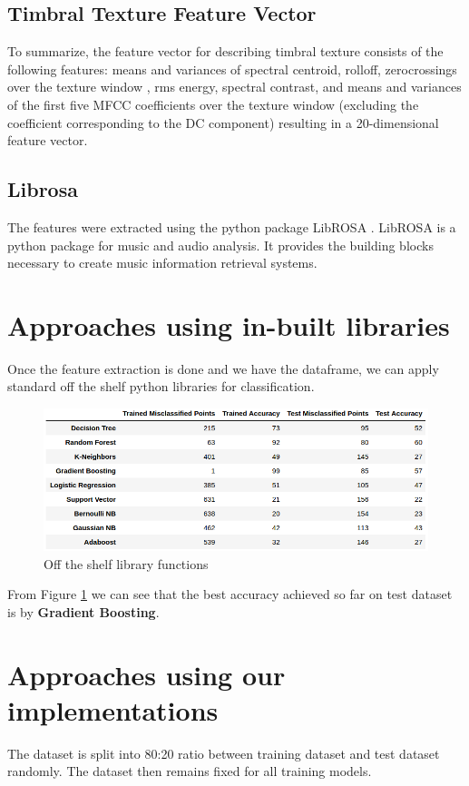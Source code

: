 \documentclass[a4paper,10pt]{article}
\begin{document}
\subsection{Timbral Texture Feature Vector}
To summarize, the feature vector for describing timbral texture consists of the following features: means and variances of spectral centroid, rolloff, zerocrossings over the texture window , rms energy, spectral contrast, and means and variances of the first five MFCC coefficients over the texture window (excluding the coefficient corresponding to the DC component) resulting in a 20-dimensional feature vector.


\subsection{Librosa}
The features were extracted using the python package LibROSA  \cite{brian_mcfee-proc-scipy-2015}. LibROSA is a python package for music and audio analysis. It provides the building blocks necessary to create music information retrieval systems.

\section{Approaches using in-built libraries}
Once the feature extraction is done and we have the dataframe, we can apply standard off the shelf python libraries for classification.

\begin{figure}[ht]
    \centering
    \includegraphics[scale=0.5]{libraryFunctionsTable.png}
    \caption{Off the shelf library functions}
    \label{fig:libraryFunctionsTable}
\end{figure}


From Figure \ref{fig:libraryFunctionsTable} we can see that the best accuracy achieved so far on test dataset is by \textbf{Gradient Boosting}.

\section{Approaches using our implementations}
The dataset is split into 80:20 ratio between training dataset and test dataset randomly. The dataset then remains fixed for all training models.
\end{document}
